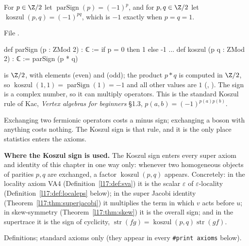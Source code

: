 \begin{definition}\label{l17:def:koszul}
For $p\in\Z/2$ let $\operatorname{parSign}(p)=(-1)^p$, and for $p,q\in\Z/2$ let
$\operatorname{koszul}(p,q)=(-1)^{pq}$, which is $-1$ exactly when $p=q=1$.
\end{definition}
\noindent File .
\begin{leancode}
def parSign (p : ZMod 2) : ℂ := if p = 0 then 1 else -1
...
def koszul (p q : ZMod 2) : ℂ := parSign (p * q)
\end{leancode}
\begin{dictionary}
 is $\Z/2$, with elements  (even) and  (odd); the product $p*q$ is
computed in $\Z/2$, so $\operatorname{koszul}(1,1)=\operatorname{parSign}(1)=-1$ and all other values
are $1$ (, ). The sign is a complex number, so it can
multiply operators. This is the standard Koszul rule of Kac, \emph{Vertex algebras for beginners}
§1.3, $p(a,b)=(-1)^{p(a)p(b)}$.
\end{dictionary}
\begin{physics}
Exchanging two fermionic operators costs a minus sign; exchanging a boson with anything costs
nothing. The Koszul sign is that rule, and it is the only place statistics enters the axioms.
\end{physics}
\noindent\textbf{Where the Koszul sign is used.} The Koszul sign enters every super axiom and
identity of this chapter in one way only: whenever two homogeneous objects of parities $p,q$ are
exchanged, a factor $\operatorname{koszul}(p,q)$ appears. Concretely: in the locality axiom VA4
(Definition~\ref{l17:def:sva}) it is the scalar $\varepsilon$ of $\varepsilon$-locality
(Definition~\ref{l17:def:localeps} below); in the super Jacobi identity
(Theorem~\ref{l17:thm:superjacobi}) it multiplies the term in which $v$ acts before $u$; in
skew-symmetry (Theorem~\ref{l17:thm:skew}) it is the overall sign; and in the supertrace it is the
sign of cyclicity, $\operatorname{str}(fg)=\operatorname{koszul}(p,q)\operatorname{str}(gf)$.
\begin{status}
Definitions; standard axioms only (they appear in every \texttt{\#print axioms} below).
\end{status}

